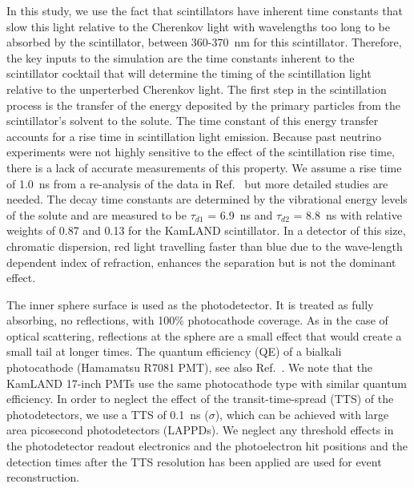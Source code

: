 In this study, we use the fact that scintillators have inherent time constants that slow this light relative to the Cherenkov light with wavelengths too long to be absorbed by the scintillator, between 360-370~nm for this scintillator. Therefore, the key inputs to the simulation are the time constants inherent to the scintillator cocktail that will determine the timing of the scintillation light relative to the unperterbed Cherenkov light. The first step in the scintillation process is the transfer of the energy deposited by the primary particles from the scintillator's solvent to the solute. The time constant of this energy transfer accounts for a rise time in scintillation light emission. Because past neutrino experiments were not highly sensitive to the effect of the scintillation rise time, there is a lack of accurate measurements of this property. We assume a rise time of 1.0~ns from a re-analysis of the data in Ref.~\cite{ChristophThesis} but more detailed studies are needed. The decay time constants are determined by the vibrational energy levels of the solute and are measured to be $\tau_{d1}$ = 6.9~ns and $\tau_{d2}$ = 8.8~ns with relative weights of 0.87 and 0.13 for the KamLAND scintillator\cite{tajimaThesis}. In a detector of this size, chromatic dispersion, red light travelling faster than blue due to the wave-length dependent index of refraction, enhances the separation but is not the dominant effect.

The inner sphere surface is used as the photodetector. It is treated as fully absorbing, no reflections, with 100\% photocathode coverage. As in the case of optical scattering, reflections at the sphere are a small effect that would create a small tail at longer times. The quantum efficiency (QE) of a bialkali photocathode (Hamamatsu R7081 PMT)\cite{Hamamatsu_R7081}, see also Ref.~\cite{dctwo}. We note that the KamLAND 17-inch PMTs use the same photocathode type with similar quantum efficiency. In order to neglect the effect of the transit-time-spread (TTS) of the photodetectors, we use a TTS of 0.1~ns ($\sigma$), which can be achieved with large area picosecond photodetectors
(LAPPDs)\cite{anode_paper,PSEC4_paper,RSI_paper,Vienna2013,Ceramic_paper1,HV_paper,Timing_paper,Incom_paper}. We neglect any threshold effects in the photodetector readout electronics and the photoelectron hit positions and the detection times after the TTS resolution has been applied are used for event reconstruction.
